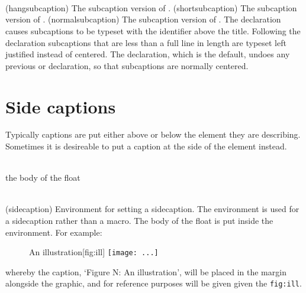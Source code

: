 \begin{syntax}
\cmd{\hangsubcaption} \\
\cmd{\shortsubcaption} \\
\cmd{\normalsubcaption} \\
\end{syntax}
\glossary(hangsubcaption)%
  {}%
  {The subcaption version of .}
\glossary(shortsubcaption)%
  {}%
  {The subcaption version of .}
\glossary(normalsubcaption)%
  {}%
  {The subcaption version of .}
The \cmd{\hangsubcaption} declaration causes subcaptions to be typeset
with the identifier above the title. Following the \cmd{\shortsubcaption}
declaration subcaptions that are less than a full line in length are
typeset left justified instead of centered. The \cmd{\normalsubcaption}
declaration, which is the default, undoes any previous \cmd{\hangsubcaption}
or \cmd{\shortsubcaption} declaration, so that subcaptions are normally
centered.


\section{Side captions}


    Typically captions are put either above or below the element they
are describing. Sometimes it is desireable to put a caption at the
side of the element instead.


\begin{syntax}
 \\
 the body of the float \\
 \\
\end{syntax}
\glossary(sidecaption)%
  {}%
  {Environment for setting a sidecaption.}%
    The  environment is used for a sidecaption rather than a
macro. The body of the float is put inside the environment. For example:
\begin{lcode}
\begin{figure}
  \begin{sidecaption}{An illustration}[fig:ill]
    \centering
    \texttt{[image: ...]}
  \end{sidecaption}
\end{figure}
\end{lcode}
whereby the caption, `Figure N: An illustration', will be placed in the 
margin alongside the graphic, and for reference purposes will be given 
given the  \texttt{fig:ill}.

